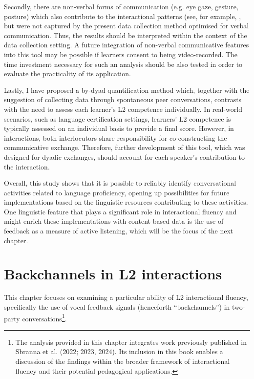 Secondly, there are non-verbal forms of communication (e.g. eye gaze, gesture, posture) which also contribute to the interactional patterns (see, for example, \citet{Kosmala2024}, but were not captured by the present data collection method optimised for verbal communication. Thus, the results should be interpreted within the context of the data collection setting. A future integration of non-verbal communicative features into this tool may be possible if learners consent to being video-recorded. The time investment necessary for such an analysis should be also tested in order to evaluate the practicality of its application.

Lastly, I have proposed a by-dyad quantification method which, together with the suggestion of collecting data through spontaneous peer conversations, contrasts with the need to assess each learner’s L2 competence individually. In real-world scenarios, such as language certification settings, learners’ L2 competence is typically assessed on an individual basis to provide a final score. However, in interactions, both interlocutors share responsibility for co-constructing the communicative exchange. Therefore, further development of this tool, which was designed for dyadic exchanges, should account for each speaker’s contribution to the interaction.

Overall, this study shows that it is possible to reliably identify conversational activities related to language proficiency, opening up possibilities for future implementations based on the linguistic resources contributing to these activities. One linguistic feature that plays a significant role in interactional fluency and might enrich these implementations with content-based data is the use of feedback as a measure of active listening, which will be the focus of the next chapter.

\section{Backchannels in L2 interactions}
\hypertarget{Toc191305941}{}
This chapter focuses on examining a particular ability of L2 interactional fluency, specifically the use of vocal feedback signals (henceforth “backchannels”) in two-party conversations\footnote{The analysis provided in this chapter integrates work previously published in Sbranna et al. (2022; 2023, 2024). Its inclusion in this book enables a discussion of the findings within the broader framework of interactional fluency and their potential pedagogical applications.}. 

